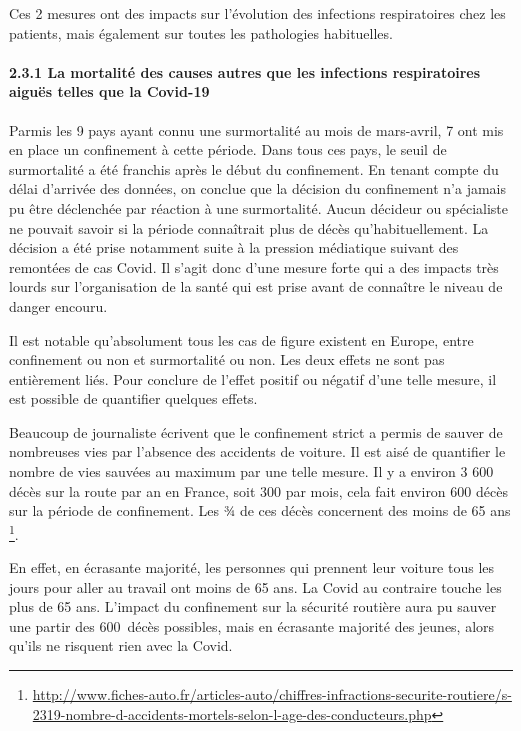 \documentclass[
]{article}
\begin{document}
Ces 2 mesures ont des impacts sur l'évolution des infections
respiratoires chez les patients, mais également sur toutes les
pathologies habituelles.

\hypertarget{la-mortalituxe9-des-causes-autres-que-les-infections-respiratoires-aiguuxebs-telles-que-la-covid-19}{%
\paragraph{2.3.1 La mortalité des causes autres que les infections
respiratoires aiguës telles que la
Covid-19}\label{la-mortalituxe9-des-causes-autres-que-les-infections-respiratoires-aiguuxebs-telles-que-la-covid-19}}

Parmis les 9 pays ayant connu une surmortalité au mois de mars-avril, 7
ont mis en place un confinement à cette période. Dans tous ces pays, le
seuil de surmortalité a été franchis après le début du confinement. En
tenant compte du délai d'arrivée des données, on conclue que la décision
du confinement n'a jamais pu être déclenchée par réaction à une
surmortalité. Aucun décideur ou spécialiste ne pouvait savoir si la
période connaîtrait plus de décès qu'habituellement. La décision a été
prise notamment suite à la pression médiatique suivant des remontées de
cas Covid. Il s'agit donc d'une mesure forte qui a des impacts très
lourds sur l'organisation de la santé qui est prise avant de connaître
le niveau de danger encouru.

Il est notable qu'absolument tous les cas de figure existent en Europe,
entre confinement ou non et surmortalité ou non. Les deux effets ne sont
pas entièrement liés. Pour conclure de l'effet positif ou négatif d'une
telle mesure, il est possible de quantifier quelques effets.

Beaucoup de journaliste écrivent que le confinement strict a permis de
sauver de nombreuses vies par l'absence des accidents de voiture. Il est
aisé de quantifier le nombre de vies sauvées au maximum par une telle
mesure. Il y a environ 3 600 décès sur la route par an en France, soit
300 par mois, cela fait environ 600 décès sur la période de confinement.
Les ¾ de ces décès concernent des moins de 65 ans \footnote{\url{http://www.fiches-auto.fr/articles-auto/chiffres-infractions-securite-routiere/s-2319-nombre-d-accidents-mortels-selon-l-age-des-conducteurs.php}}.

En effet, en écrasante majorité, les personnes qui prennent leur voiture
tous les jours pour aller au travail ont moins de 65 ans. La Covid au
contraire touche les plus de 65 ans. L'impact du confinement sur la
sécurité routière aura pu sauver une partir des 600~décès possibles,
mais en écrasante majorité des jeunes, alors qu'ils ne risquent rien
avec la Covid.
\end{document}
